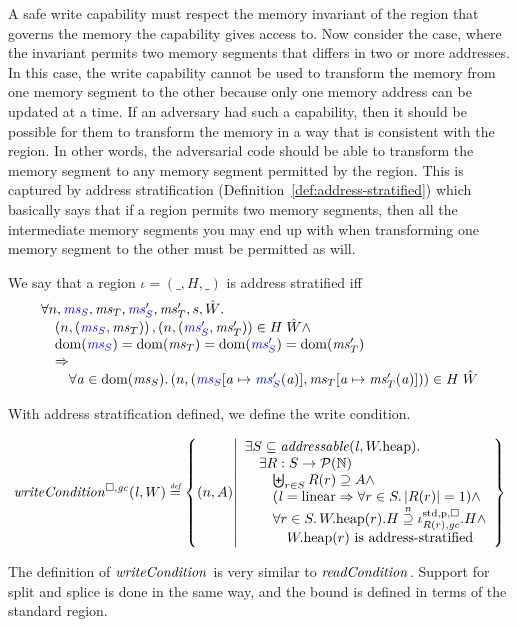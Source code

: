 \begin{jversion}
A safe write capability must respect the memory invariant of the region that governs the memory the capability gives access to.
Now consider the case, where the invariant permits two memory segments that differs in two or more addresses.
In this case, the write capability cannot be used to transform the memory from one memory segment to the other because only one memory address can be updated at a time.
If an adversary had such a capability, then it should be possible for them to transform the memory in a way that is consistent with the region.
In other words, the adversarial code should be able to transform the memory segment to any memory segment permitted by the region.
This is captured by address stratification (Definition~\ref{def:address-stratified}) which basically says that if a region permits two memory segments, then all the intermediate memory segments you may end up with when transforming one memory segment to the other must be permitted as will.
\begin{definition}
  \label{def:address-stratified}
  We say that a region $\iota = (\_,H,\_)$ is address stratified iff
  \[
    \begin{array}{l}
      \forall n, \src{\ms_S},\ms_T,\src{\ms_S'},\ms_T',s,\hat{W}\ldotp \\
      \quad \npair{\stpair{\ms}{\ms}}, \npair{\stpair[.]{\ms_S'}{\ms_T'}} \in H \; \hat{W} \wedge \\
      \quad \dom(\src{\ms_S}) = \dom(\ms_T) = \dom(\src{\ms_S'}) = \dom(\ms_T') \\
      \quad \Rightarrow \\
      \qquad \forall \aaddr \in \dom(\ms_S) \ldotp \npair{(\src{\ms_S}\update{\aaddr}{\src{\ms_S'}(\aaddr)},\ms_T\update{\aaddr}{\ms_T'(\aaddr)})} \in H \; \hat{W}
    \end{array}
  \]
\end{definition}
With address stratification defined, we define the write condition.
\begin{definition}
\[
  \writeCond{\lin,W} \defeq \left\{ \npair{A} \middle| 
    \begin{array}{l}
      \exists S \subseteq \addressable{\lin, \pwheap} \ldotp \\
      \quad \exists R : S \fun \powerset{\nats}\\
      \qquad \biguplus_{r\in S} R(r) \supseteq A \wedge\\
      \qquad (\lin = \linear \Rightarrow \forall r \in S \ldotp |R(r)|  = 1) \wedge\\
      \qquad \forall r \in S \ldotp \pwheap(r).H \nsupeq \stdreg{R(r),\gc}{\pur}.H \wedge\\
      \qquad \quad \pwheap(r) \text{ is address-stratified}
    \end{array}
  \right\}
\]
\end{definition}
The definition of $\writeCond[]{}$ is very similar to $\readCond[]{}$.
Support for split and splice is done in the same way, and the bound is defined in terms of the standard region.


\end{jversion}
